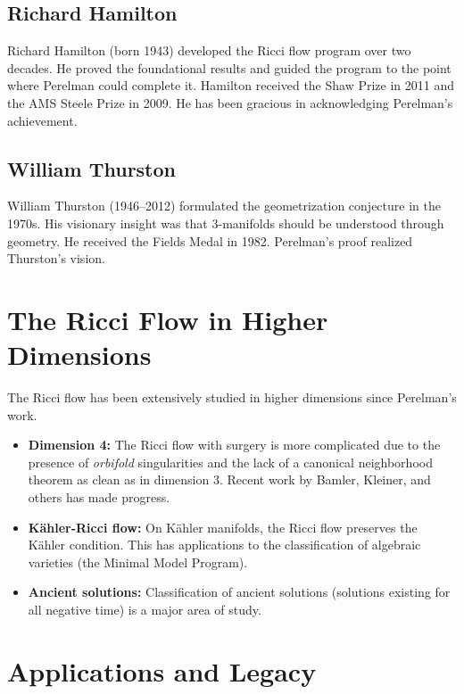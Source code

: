 \subsection{Richard Hamilton}

Richard Hamilton (born 1943) developed the Ricci flow program over two decades. He proved the foundational results and guided the program to the point where Perelman could complete it. Hamilton received the Shaw Prize in 2011 and the AMS Steele Prize in 2009. He has been gracious in acknowledging Perelman's achievement.

\subsection{William Thurston}

William Thurston (1946--2012) formulated the geometrization conjecture in the 1970s. His visionary insight was that 3-manifolds should be understood through geometry. He received the Fields Medal in 1982. Perelman's proof realized Thurston's vision.

\section{The Ricci Flow in Higher Dimensions}

The Ricci flow has been extensively studied in higher dimensions since Perelman's work.

\begin{itemize}
  \item \textbf{Dimension 4:} The Ricci flow with surgery is more complicated due to the presence of \textit{orbifold} singularities and the lack of a canonical neighborhood theorem as clean as in dimension 3. Recent work by Bamler, Kleiner, and others has made progress.
  \item \textbf{K\"{a}hler-Ricci flow:} On K\"{a}hler manifolds, the Ricci flow preserves the K\"{a}hler condition. This has applications to the classification of algebraic varieties (the Minimal Model Program).
  \item \textbf{Ancient solutions:} Classification of ancient solutions (solutions existing for all negative time) is a major area of study.
\end{itemize}

\section{Applications and Legacy}

